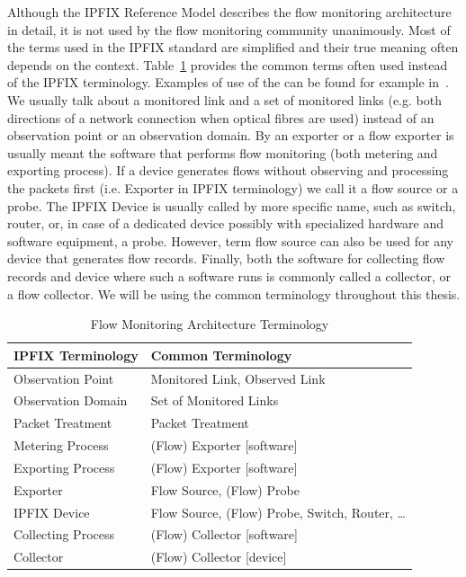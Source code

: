 Although the IPFIX Reference Model describes the flow monitoring architecture in detail, it is not used by the flow monitoring community unanimously. Most of the terms used in the IPFIX standard are simplified and their true meaning often depends on the context. Table~\ref{tab:flow_monitoring_terminology} provides the common terms often used instead of the IPFIX terminology. Examples of use of the  can be found for example in~\cite{Hofstede-2014-Flow, Cejka-2015-Using, Brownlee-2011-Flow, Krmicek-2009-Netflow, Lee-2007-End, Lee-2007-IPv6, Molina-2006-Design}. We usually talk about a monitored link and a set of monitored links (e.g. both directions of a network connection when optical fibres are used) instead of an observation point or an observation domain. By an exporter or a flow exporter is usually meant the software that performs flow monitoring (both metering and exporting process). If a device generates flows without observing and processing the packets first (i.e. Exporter in IPFIX terminology) we call it a flow source or a probe. The IPFIX Device is usually called by more specific name, such as switch, router, or, in case of a dedicated device possibly with specialized hardware and software equipment, a probe. However, term flow source can also be used for any device that generates flow records. Finally, both the software for collecting flow records and device where such a software runs is commonly called a collector, or a flow collector. We will be using the common terminology throughout this thesis.

\begin{table}[t!]
	\centering
	\begin{tabular}{ll}
	\toprule
		\textbf{IPFIX Terminology}  & \textbf{Common Terminology}                 \\ \midrule
		Observation Point   &  Monitored Link, Observed Link                      \\
		Observation Domain  &  Set of Monitored Links                             \\
		Packet Treatment    &  Packet Treatment                                   \\
		Metering Process    &  (Flow) Exporter [software]                         \\
		Exporting Process   &  (Flow) Exporter [software]                         \\
		Exporter            &  Flow Source, (Flow) Probe                          \\
		IPFIX Device        &  Flow Source, (Flow) Probe, Switch, Router, \ldots  \\
		Collecting Process  &  (Flow) Collector [software]                        \\
		Collector           &  (Flow) Collector [device]                          \\ \bottomrule
	\end{tabular}
	\caption{Flow Monitoring Architecture Terminology}
	\label{tab:flow_monitoring_terminology}
\end{table}


